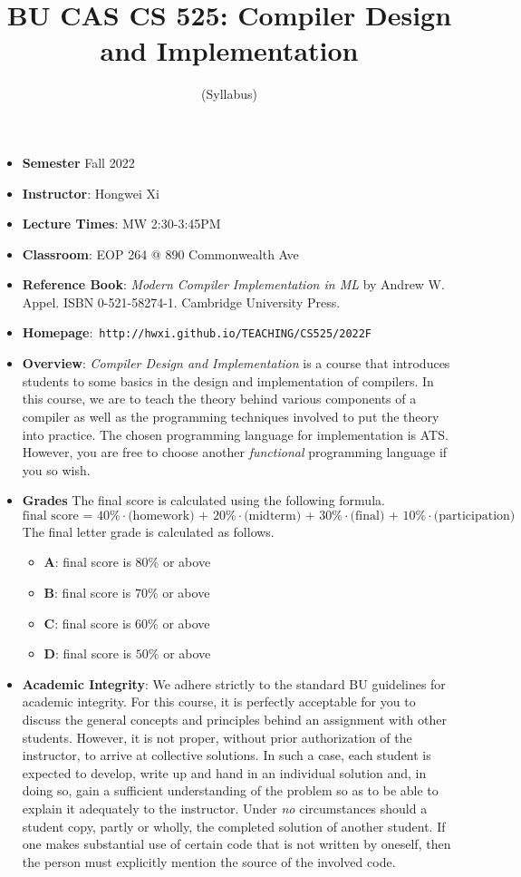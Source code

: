 \documentclass[11pt]{article}
\title{BU CAS CS 525: Compiler Design and Implementation}
\author{(Syllabus)}
\date{}
\begin{document}
\maketitle
\thispagestyle{empty}

\begin{itemize}
\item {\bf Semester} Fall 2022
\item {\bf Instructor}: Hongwei Xi
\item {\bf Lecture Times}: MW 2:30-3:45PM
\item {\bf Classroom}: EOP 264 @ 890 Commonwealth Ave
\item {\bf Reference Book}:\kern6pt
{\em Modern Compiler Implementation in ML} by Andrew W. Appel.  ISBN
0-521-58274-1. Cambridge University Press.
\item {\bf Homepage}:~{\tt http://hwxi.github.io/TEACHING/CS525/2022F}
\item {\bf Overview}:
{\em Compiler Design and Implementation} is a course that introduces
students to some basics in the design and implementation of compilers. In
this course, we are to teach the theory behind various components of a
compiler as well as the programming techniques involved to put the theory
into practice. The chosen programming language for implementation is
ATS. However, you are free to choose another {\em functional} programming
language if you so wish.

\item {\bf Grades}
The final score is calculated using the following formula.
\[\mbox{final score = 40\%$\cdot$(homework) + 20\%$\cdot$(midterm) + 30\%$\cdot$(final) + 10\%$\cdot$(participation)}\]
The final letter grade is calculated as follows.
\begin{itemize}
\item{\bf A}: final score is $80\%$ or above
\item{\bf B}: final score is $70\%$ or above
\item{\bf C}: final score is $60\%$ or above
\item{\bf D}: final score is $50\%$ or above
\end{itemize}

\item {\bf Academic Integrity}:
We adhere strictly to the standard BU guidelines for academic
integrity. For this course, it is perfectly acceptable for you to discuss
the general concepts and principles behind an assignment with other
students. However, it is not proper, without prior authorization of the
instructor, to arrive at collective solutions. In such a case, each student
is expected to develop, write up and hand in an individual solution and, in
doing so, gain a sufficient understanding of the problem so as to be able
to explain it adequately to the instructor.  Under {\em no} circumstances
should a student copy, partly or wholly, the completed solution of another
student. If one makes substantial use of certain code that is not written by
oneself, then the person must explicitly mention the source of the involved
code.

\end{itemize}
\end{document}
